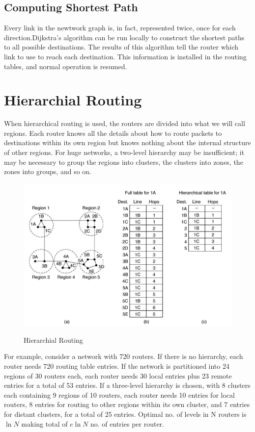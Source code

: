 \documentclass[a4paper,oneside]{book}
\begin{document}
\subsection{Computing Shortest Path}
 Every link in the newtwork graph is, in fact, represented twice, once for each direction.Dijkstra's algorithm can be run locally to construct the shortest paths to all possible destinations. The results of this algorithm tell the router which link to use to reach each destination. This information is installed in the routing tables, and normal operation is resumed.
\section{Hierarchial Routing}
When hierarchical routing is used, the routers are divided into what we will call regions. Each router knows all the details about how to route packets to destinations within its own region but knows nothing about the internal structure of other regions. For huge networks, a two-level hierarchy may be insufficient; it may be necessary to group the regions into clusters, the clusters into zones, the zones into groups, and so on.
\begin{figure}[H]
\caption{Hierarchial Routing}
\includegraphics[scale=0.6]{Images/hierar_rout}
\label{fig:cn_hie_rout}
\end{figure}
 For example, consider a network with 720 routers. If there is no hierarchy, each router needs 720 routing table entries. If the network is partitioned into 24 regions of 30 routers each, each router needs 30 local entries plus 23 remote entries for a total of 53 entries. If a three-level hierarchy is chosen, with 8 clusters each containing 9 regions of 10 routers, each router needs 10 entries for local routers, 8 entries for routing to other regions within its own cluster, and 7 entries for distant clusters, for a total of 25 entries. Optimal no. of levels in N routers is $\ln N$ making total of $e \ln N$ no. of entries per router.
\end{document}
